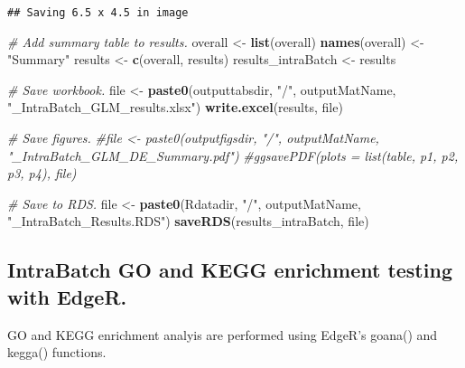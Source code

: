 \documentclass[]{article}
\newenvironment{Shaded}{\begin{snugshade}}{\end{snugshade}}
\newcommand{\KeywordTok}[1]{\textcolor[rgb]{0.13,0.29,0.53}{\textbf{#1}}}
\newcommand{\StringTok}[1]{\textcolor[rgb]{0.31,0.60,0.02}{#1}}
\newcommand{\CommentTok}[1]{\textcolor[rgb]{0.56,0.35,0.01}{\textit{#1}}}
\newcommand{\NormalTok}[1]{#1}
\begin{document}
\begin{verbatim}
## Saving 6.5 x 4.5 in image
\end{verbatim}

\begin{Shaded}
\begin{Highlighting}[]
\CommentTok{# Add summary table to results.}
\NormalTok{overall <-}\StringTok{ }\KeywordTok{list}\NormalTok{(overall)}
\KeywordTok{names}\NormalTok{(overall) <-}\StringTok{ "Summary"}
\NormalTok{results <-}\StringTok{ }\KeywordTok{c}\NormalTok{(overall, results)}
\NormalTok{results_intraBatch <-}\StringTok{ }\NormalTok{results}

\CommentTok{# Save workbook.}
\NormalTok{file <-}\StringTok{ }\KeywordTok{paste0}\NormalTok{(outputtabsdir, }\StringTok{"/"}\NormalTok{, outputMatName, }\StringTok{"_IntraBatch_GLM_results.xlsx"}\NormalTok{)}
\KeywordTok{write.excel}\NormalTok{(results, file)}

\CommentTok{# Save figures.}
\CommentTok{#file <- paste0(outputfigsdir, "/", outputMatName, "_IntraBatch_GLM_DE_Summary.pdf")}
\CommentTok{#ggsavePDF(plots = list(table, p1, p2, p3, p4), file)}

\CommentTok{# Save to RDS.}
\NormalTok{file <-}\StringTok{ }\KeywordTok{paste0}\NormalTok{(Rdatadir, }\StringTok{"/"}\NormalTok{, outputMatName, }\StringTok{"_IntraBatch_Results.RDS"}\NormalTok{)}
\KeywordTok{saveRDS}\NormalTok{(results_intraBatch, file)}
\end{Highlighting}
\end{Shaded}

\subsection{IntraBatch GO and KEGG enrichment testing with
EdgeR.}\label{intrabatch-go-and-kegg-enrichment-testing-with-edger.}

GO and KEGG enrichment analyis are performed using EdgeR's goana() and
kegga() functions.
\end{document}
